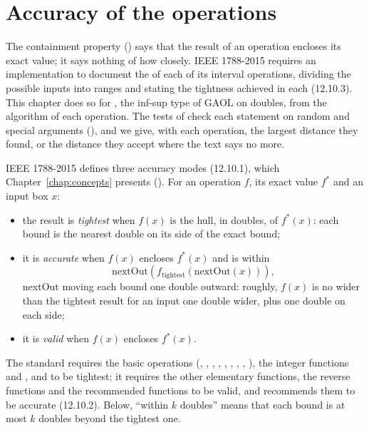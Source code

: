 \chapter{Accuracy of the operations}\label{chap:accuracy}
%

The containment property () says that the result of
an operation encloses its exact value; it says nothing of how closely.
IEEE 1788-2015 \cite{IEEE1788:2015} requires an implementation to document
the  of each of its interval operations, dividing the
possible inputs into ranges and stating the tightness achieved in each
(12.10.3). This chapter does so for , the inf-sup type of
GAOL on doubles, from the algorithm of each operation. The tests of
 check each statement on random and special arguments
(), and we give, with each operation, the largest
distance they found, or the distance they accept where the text says no more.\newinvfive

\medskip
IEEE 1788-2015 defines three accuracy modes (12.10.1), which
Chapter~\ref{chap:concepts} presents (). For an
operation $f$, its exact value $f^*$ and an input box $x$:
\begin{itemize}
\item the result is \emph{tightest} when $f(x)$ is the hull, in doubles, of
  $f^*(x)$: each bound is the nearest double on its side of the exact bound;
\item it is \emph{accurate} when $f(x)$ encloses $f^*(x)$ and is within
  \[\text{nextOut}(f_{\text{tightest}}(\text{nextOut}(x))),\]
  nextOut moving each bound one double outward: roughly, $f(x)$ is no wider
  than the tightest result for an input one double wider, plus one double on
  each side;
\item it is \emph{valid} when $f(x)$ encloses $f^*(x)$.
\end{itemize}

\noindent
The standard requires the basic operations (, , ,
, , , , , ),
the integer functions and ,  and  to be
tightest; it requires the other elementary functions, the reverse functions
and the recommended functions to be valid, and recommends them to be
accurate (12.10.2). Below, ``within $k$ doubles'' means that each bound is
at most $k$ doubles beyond the tightest one.

